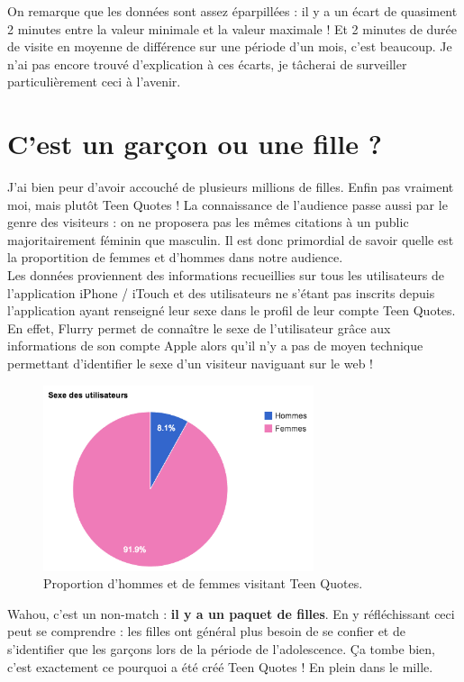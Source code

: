 \documentclass{report}
\begin{document}
	On remarque que les données sont assez éparpillées : il y a un écart de quasiment 2 minutes entre la valeur minimale et la valeur maximale ! Et 2 minutes de durée de visite en moyenne de différence sur une période d'un mois, c'est beaucoup. Je n'ai pas encore trouvé d'explication à ces écarts, je tâcherai de surveiller particulièrement ceci à l'avenir.

	\section{C'est un garçon ou une fille ?}
	J'ai bien peur d'avoir accouché de plusieurs millions de filles. Enfin pas vraiment moi, mais plutôt Teen Quotes ! La connaissance de l'audience passe aussi par le genre des visiteurs : on ne proposera pas les mêmes citations à un public majoritairement féminin que masculin. Il est donc primordial de savoir quelle est la proportition de femmes et d'hommes dans notre audience.\\

	Les données proviennent des informations recueillies sur tous les utilisateurs de l'application iPhone / iTouch et des utilisateurs ne s'étant pas inscrits depuis l'application ayant renseigné leur sexe dans le profil de leur compte Teen Quotes. En effet, Flurry permet de connaître le sexe de l'utilisateur grâce aux informations de son compte Apple alors qu'il n'y a pas de moyen technique permettant d'identifier le sexe d'un visiteur naviguant sur le web !
	\begin{figure}[H]
		\center
		\includegraphics[width=300px]{images/sexeUtilisateurs.png}
		\caption{Proportion d'hommes et de femmes visitant Teen Quotes.}
	\end{figure}
	Wahou, c'est un non-match : \textbf{il y a un paquet de filles}. En y réfléchissant ceci peut se comprendre : les filles ont général plus besoin de se confier et de s'identifier que les garçons lors de la période de l'adolescence. Ça tombe bien, c'est exactement ce pourquoi a été créé Teen Quotes ! En plein dans le mille.
\end{document}
